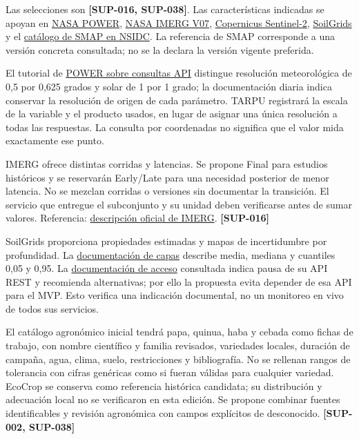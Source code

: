 \documentclass[10pt,a4paper]{article}
\begin{document}
Las selecciones son \textbf{[SUP-016, SUP-038]}. Las características indicadas se apoyan en \href{https://power.larc.nasa.gov/docs/services/api/temporal/daily/}{NASA POWER}, \href{https://gpm.nasa.gov/resources/documents/imerg-v07-technical-documentation}{NASA IMERG V07}, \href{https://documentation.dataspace.copernicus.eu/Data/SentinelMissions/Sentinel2.html}{Copernicus Sentinel-2}, \href{https://docs.isric.org/globaldata/soilgrids/SoilGrids_faqs.html}{SoilGrids} y el \href{https://nsidc.org/data/spl3smp_e/versions/3}{catálogo de SMAP en NSIDC}. La referencia de SMAP corresponde a una versión concreta consultada; no se la declara la versión vigente preferida.


El tutorial de \href{https://power.larc.nasa.gov/docs/tutorials/service-data-request/api/}{POWER sobre consultas API} distingue resolución meteorológica de 0,5 por 0,625 grados y solar de 1 por 1 grado; la documentación diaria indica conservar la resolución de origen de cada parámetro. TARPU registrará la escala de la variable y el producto usados, en lugar de asignar una única resolución a todas las respuestas. La consulta por coordenadas no significa que el valor mida exactamente ese punto.


IMERG ofrece distintas corridas y latencias. Se propone Final para estudios históricos y se reservarán Early/\allowbreak{}Late para una necesidad posterior de menor latencia. No se mezclan corridas o versiones sin documentar la transición. El servicio que entregue el subconjunto y su unidad deben verificarse antes de sumar valores. Referencia: \href{https://gpm.nasa.gov/data/imerg}{descripción oficial de IMERG}. \textbf{[SUP-016]}


SoilGrids proporciona propiedades estimadas y mapas de incertidumbre por profundidad. La \href{https://docs.isric.org/globaldata/soilgrids/SoilGrids_faqs_01.html}{documentación de capas} describe media, mediana y cuantiles 0,05 y 0,95. La \href{https://docs.isric.org/globaldata/soilgrids/SoilGrids_faqs_02.html}{documentación de acceso} consultada indica pausa de su API REST y recomienda alternativas; por ello la propuesta evita depender de esa API para el MVP. Esto verifica una indicación documental, no un monitoreo en vivo de todos sus servicios.


El catálogo agronómico inicial tendrá papa, quinua, haba y cebada como fichas de trabajo, con nombre científico y familia revisados, variedades locales, duración de campaña, agua, clima, suelo, restricciones y bibliografía. No se rellenan rangos de tolerancia con cifras genéricas como si fueran válidas para cualquier variedad. EcoCrop se conserva como referencia histórica candidata; su distribución y adecuación local no se verificaron en esta edición. Se propone combinar fuentes identificables y revisión agronómica con campos explícitos de desconocido. \textbf{[SUP-002, SUP-038]}
\end{document}
